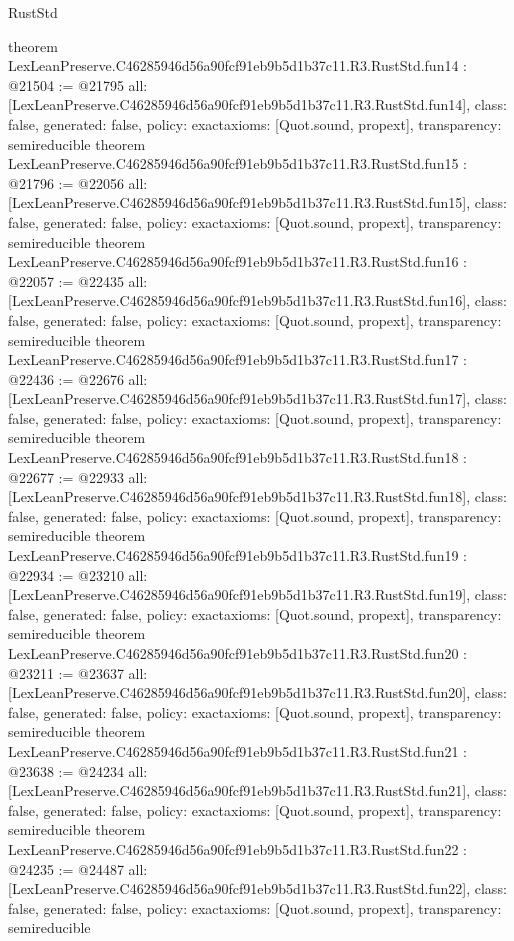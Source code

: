 \begin{lexlean}{RustStd}
\begin{coremodule}
{}
theorem LexLeanPreserve.C46285946d56a90fcf91eb9b5d1b37c11.R3.RustStd.fun14 : @21504 := @21795 {
  all: [LexLeanPreserve.C46285946d56a90fcf91eb9b5d1b37c11.R3.RustStd.fun14],
  class: false,
  generated: false,
  policy: exact{axioms: [Quot.sound, propext]},
  transparency: semireducible
}
theorem LexLeanPreserve.C46285946d56a90fcf91eb9b5d1b37c11.R3.RustStd.fun15 : @21796 := @22056 {
  all: [LexLeanPreserve.C46285946d56a90fcf91eb9b5d1b37c11.R3.RustStd.fun15],
  class: false,
  generated: false,
  policy: exact{axioms: [Quot.sound, propext]},
  transparency: semireducible
}
theorem LexLeanPreserve.C46285946d56a90fcf91eb9b5d1b37c11.R3.RustStd.fun16 : @22057 := @22435 {
  all: [LexLeanPreserve.C46285946d56a90fcf91eb9b5d1b37c11.R3.RustStd.fun16],
  class: false,
  generated: false,
  policy: exact{axioms: [Quot.sound, propext]},
  transparency: semireducible
}
theorem LexLeanPreserve.C46285946d56a90fcf91eb9b5d1b37c11.R3.RustStd.fun17 : @22436 := @22676 {
  all: [LexLeanPreserve.C46285946d56a90fcf91eb9b5d1b37c11.R3.RustStd.fun17],
  class: false,
  generated: false,
  policy: exact{axioms: [Quot.sound, propext]},
  transparency: semireducible
}
theorem LexLeanPreserve.C46285946d56a90fcf91eb9b5d1b37c11.R3.RustStd.fun18 : @22677 := @22933 {
  all: [LexLeanPreserve.C46285946d56a90fcf91eb9b5d1b37c11.R3.RustStd.fun18],
  class: false,
  generated: false,
  policy: exact{axioms: [Quot.sound, propext]},
  transparency: semireducible
}
theorem LexLeanPreserve.C46285946d56a90fcf91eb9b5d1b37c11.R3.RustStd.fun19 : @22934 := @23210 {
  all: [LexLeanPreserve.C46285946d56a90fcf91eb9b5d1b37c11.R3.RustStd.fun19],
  class: false,
  generated: false,
  policy: exact{axioms: [Quot.sound, propext]},
  transparency: semireducible
}
theorem LexLeanPreserve.C46285946d56a90fcf91eb9b5d1b37c11.R3.RustStd.fun20 : @23211 := @23637 {
  all: [LexLeanPreserve.C46285946d56a90fcf91eb9b5d1b37c11.R3.RustStd.fun20],
  class: false,
  generated: false,
  policy: exact{axioms: [Quot.sound, propext]},
  transparency: semireducible
}
theorem LexLeanPreserve.C46285946d56a90fcf91eb9b5d1b37c11.R3.RustStd.fun21 : @23638 := @24234 {
  all: [LexLeanPreserve.C46285946d56a90fcf91eb9b5d1b37c11.R3.RustStd.fun21],
  class: false,
  generated: false,
  policy: exact{axioms: [Quot.sound, propext]},
  transparency: semireducible
}
theorem LexLeanPreserve.C46285946d56a90fcf91eb9b5d1b37c11.R3.RustStd.fun22 : @24235 := @24487 {
  all: [LexLeanPreserve.C46285946d56a90fcf91eb9b5d1b37c11.R3.RustStd.fun22],
  class: false,
  generated: false,
  policy: exact{axioms: [Quot.sound, propext]},
  transparency: semireducible
}
\end{coremodule}
\end{lexlean}
